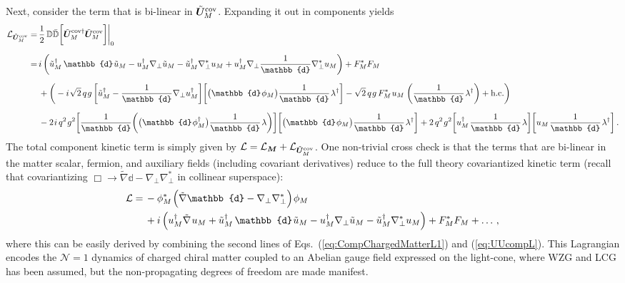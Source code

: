 \documentclass[12pt,document,nofootinbib,superscriptaddress,onecolumn,preprintnumbers,balancelastpage]{article}
\newcommand{\s}{\hspace{0.8pt}}
\newcommand{\PP}{\mathbb{d}}
\DeclareRobustCommand{\Eqs}[2]{Eqs.~(\ref{#1}) and (\ref{#2})}
\newcommand{\bM}{ \boldsymbol M}
\newcommand{\bU}{ \tilde{\boldsymbol U}}
\newcommand{\D}{\mathbb{D}}
\newcommand{\uu}{\tilde u}
\begin{document}
\begin{spacing}{1.2}
Next, consider the term that is bi-linear in $\bU_M^{\rm cov}$.  Expanding it out in components yields
%
\begin{align}
\mathcal{L}_{\bU_M^{\rm cov}} =\, & \frac{1}{2}\, \D \bar{\D} \bigg[  \bU_M^{\rm cov \dagger} \bU_M^{\rm cov} \bigg] \bigg|_{0} \notag \\[6pt]
=\, & i \left( \uu_M^\dagger\, \PP\s \uu_M - u_M^\dag \nabla_\perp \uu_M -  \tilde{u}_M^\dagger \nabla_\perp^* u_M  +   u_M^\dagger \nabla_\perp  \frac{1}{\PP}  \nabla_\perp^* u_M   \right) +  F_M^* F_M \notag \\[6pt]
&+\bigg(- i \s \sqrt{2} \, q\s g\, \bigg[ \uu_M^\dagger - \frac{1}{\PP} \nabla_\perp u_M^\dagger     \bigg]  \bigg[   \big( \PP\s \phi_M \big) \frac{1}{\PP}\s \lambda^\dagger  \bigg]   -   \sqrt{2}\, q\s g\, F_M^*\s  u_M\s \left( \frac{1}{\PP}\s \lambda^\dagger \right)  + \text{h.c.}\bigg) \notag\\[6pt] 
& -2\s  i\,  q^2\s g^2 \bigg[  \frac{1}{\PP}  \bigg( \big( \PP\s \phi_M^\dagger \big) \frac{1}{\PP}\s \lambda \bigg)  \bigg]  \bigg[ \big( \PP\s \phi_M \big) \frac{1}{\PP}\s \lambda^\dagger   \bigg] + 2\, q^2\s g^2  \bigg[ u_M^\dagger \s \frac{1}{\PP}\s \lambda \bigg] \bigg[ u_M\s \frac{1}{\PP}\s \lambda^\dagger \bigg] \,.
\label{eq:UUcompL}
\end{align}
%
The total component kinetic term is simply given by $\mathcal{L} = \mathcal{L}_{\bM} + \mathcal{L}_{\bU_M^{\rm cov}}$.
%
One non-trivial cross check is that the terms that are bi-linear in the matter scalar, fermion, and auxiliary fields (including covariant derivatives) reduce to the full theory covariantized kinetic term (recall that covariantizing $\Box \rightarrow  \tilde{\nabla} \PP - \nabla_\perp \nabla_\perp^*$ in collinear superspace):
%
\begin{align}
\mathcal{L} = \, &- \phi_M^*\s \Big( \tilde{\nabla} \PP - \nabla_\perp \nabla_\perp^* \Big)\s \phi_M  \notag\\
&+i \left( u_M^\dagger \tilde{\nabla}\s u_M+ \uu_M^\dagger\, \PP\s \uu_M - u_M^\dag \nabla_\perp \uu_M -  \tilde{u}_M^\dagger \nabla_\perp^* u_M   \right) +  F_M^* F_M + \dots\,,
\end{align}
where this can be easily derived by combining the second lines of \Eqs{eq:CompChargedMatterL1}{eq:UUcompL}.
%
This Lagrangian encodes the $\mathcal{N} = 1$ dynamics of charged chiral matter coupled to an Abelian gauge field expressed on the light-cone, where WZG and LCG has been assumed, but the non-propagating degrees of freedom are made manifest.



\end{spacing}
\end{document}
